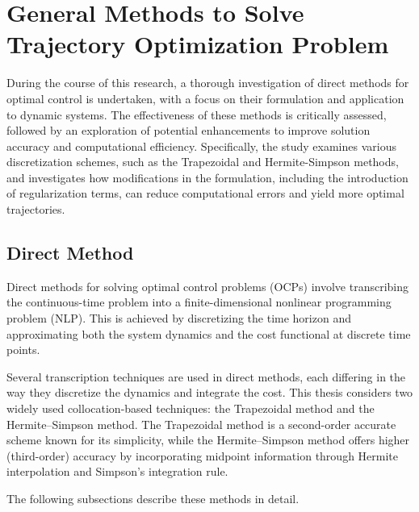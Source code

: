 
\chapter{General Methods to Solve Trajectory Optimization Problem}

\ifpdf
    \graphicspath{{Chapter2/Figs/Raster/}{Chapter2/Figs/PDF/}{Chapter2/Figs/}}
\else
    \graphicspath{{Chapter2/Figs/Vector/}{Chapter2/Figs/}}
\fi

During the course of this research, a thorough investigation of direct methods for optimal control is undertaken, with a focus on their formulation and application to dynamic systems. The effectiveness of these methods is critically assessed, followed by an exploration of potential enhancements to improve solution accuracy and computational efficiency. Specifically, the study examines various discretization schemes, such as the Trapezoidal and Hermite-Simpson methods, and investigates how modifications in the formulation, including the introduction of regularization terms, can reduce computational errors and yield more optimal trajectories.


\section{Direct Method}

Direct methods for solving optimal control problems (OCPs) involve transcribing the continuous-time problem into a finite-dimensional nonlinear programming problem (NLP). This is achieved by discretizing the time horizon and approximating both the system dynamics and the cost functional at discrete time points. 

Several transcription techniques are used in direct methods, each differing in the way they discretize the dynamics and integrate the cost. This thesis considers two widely used collocation-based techniques: the Trapezoidal method and the Hermite–Simpson method. The Trapezoidal method is a second-order accurate scheme known for its simplicity, while the Hermite–Simpson method offers higher (third-order) accuracy by incorporating midpoint information through Hermite interpolation and Simpson's integration rule.

The following subsections describe these methods in detail.


